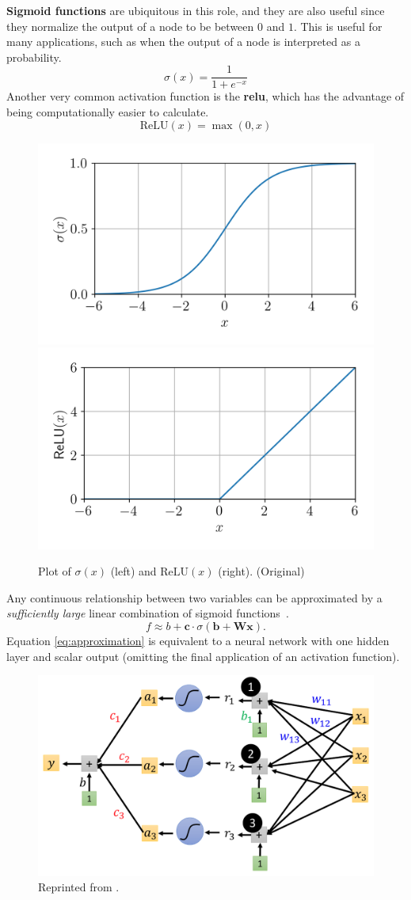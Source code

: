 \documentclass[12pt]{report}
\theoremstyle{definition}
\theoremstyle{remark}
\begin{document}
\textbf{Sigmoid functions} are ubiquitous in this role, and they are also useful since they normalize the output of a node to be between $0$ and $1$. This is useful for many applications, such as when the output of a node is interpreted as a probability.
\begin{equation}
    \sigma(x) = \frac{1}{1+e^{-x}}
\end{equation}
Another very common activation function is the \textbf{\gls{relu}}, which has the advantage of being computationally easier to calculate.
\begin{equation}
    \text{ReLU}(x) = \max(0,x)
\end{equation}
\begin{figure}[h]
    \centering
    \includegraphics[width=0.45\linewidth]{figs/sigmoid.png}
    \includegraphics[width=0.45\linewidth]{figs/relu.png}
    \caption{Plot of $\sigma(x)$ (left) and $\text{ReLU}(x)$ (right). (Original)}
    \label{fig:enter-label}
\end{figure}

Any continuous relationship between two variables can be approximated by a \textit{sufficiently large} linear combination of sigmoid functions~\cite{cybenko_approximation_1989}.
\begin{equation} \label{eq:approximation}
    f \approx b + \mathbf{c} \cdot \sigma(\mathbf{b} + \mathbf{W}\mathbf{x}).
\end{equation}
Equation \ref{eq:approximation} is equivalent to a neural network with one hidden layer and scalar output (omitting the final application of an activation function).
\begin{figure}[h]
    \centering
    \includegraphics[width=0.5\linewidth]{figs/simple.png}
    \caption{Reprinted from \cite{lee_introduction_2021}.}
    \label{fig:enter-label}
\end{figure}
\end{document}
